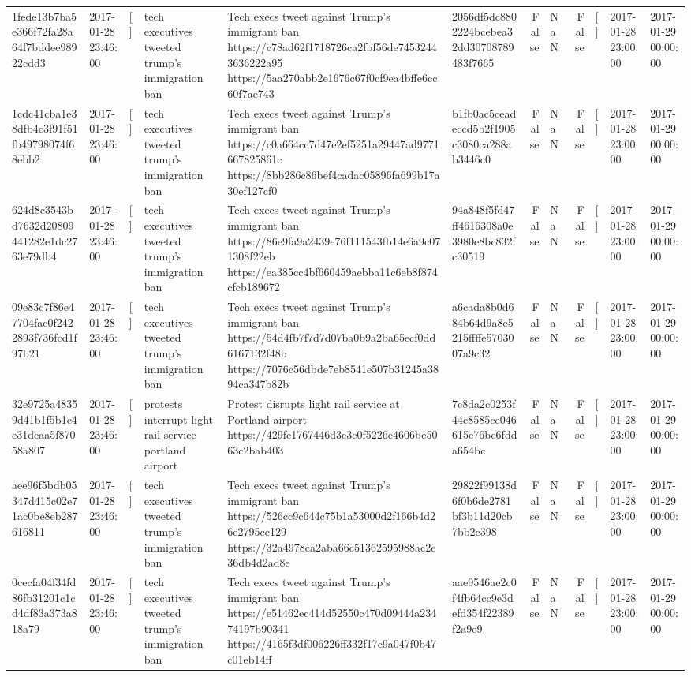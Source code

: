 \begin{tabular}{llllllrlrlll}
1fede13b7ba5e366f72fa28a64f7bddee98922cdd3 & 2017-01-28 23:46:00 & [] & tech executives tweeted trump's immigration ban & Tech execs tweet against Trump's immigrant ban https://c78ad62f1718726ca2fbf56de74532443636222a95 https://5aa270abb2e1676c67f0cf9ea4bffe6cc60f7ae743 & 2056df5dc8802224bcebea32dd30708789483f7665 & False & NaN & False & [] & 2017-01-28 23:00:00 & 2017-01-29 00:00:00 \\
1cdc41cba1e38dfb4c3f91f51fb49798074f68ebb2 & 2017-01-28 23:46:00 & [] & tech executives tweeted trump's immigration ban & Tech execs tweet against Trump's immigrant ban https://c0a664cc7d47e2ef5251a29447ad9771667825861c https://8bb286c86bef4cadac05896fa699b17a30ef127cf0 & b1fb0ac5ceadeccd5b2f1905c3080ca288ab3446c0 & False & NaN & False & [] & 2017-01-28 23:00:00 & 2017-01-29 00:00:00 \\
624d8c3543bd7632d20809441282e1dc2763e79db4 & 2017-01-28 23:46:00 & [] & tech executives tweeted trump's immigration ban & Tech execs tweet against Trump's immigrant ban https://86e9fa9a2439e76f111543fb14e6a9c071308f22eb https://ea385cc4bf660459aebba11c6eb8f874cfcb189672 & 94a848f5fd47ff4616308a0e3980e8bc832fc30519 & False & NaN & False & [] & 2017-01-28 23:00:00 & 2017-01-29 00:00:00 \\
09e83c7f86e47704fac0f2422893f736fcd1f97b21 & 2017-01-28 23:46:00 & [] & tech executives tweeted trump's immigration ban & Tech execs tweet against Trump's immigrant ban https://54d4fb7f7d7d07ba0b9a2ba65ecf0dd6167132f48b https://7076c56dbde7eb8541e507b31245a3894ca347b82b & a6cada8b0d684b64d9a8e5215ffffe5703007a9c32 & False & NaN & False & [] & 2017-01-28 23:00:00 & 2017-01-29 00:00:00 \\
32e9725a48359d41b1f5b1c4e31dcaa5f87058a807 & 2017-01-28 23:46:00 & [] & protests interrupt light rail service portland airport & Protest disrupts light rail service at Portland airport https://429fc1767446d3c3c0f5226e4606be5063c2bab403 & 7c8da2c0253f44c8585ce046615c76be6fdda654bc & False & NaN & False & [] & 2017-01-28 23:00:00 & 2017-01-29 00:00:00 \\
aee96f5bdb05347d415c02e71ac0be8eb287616811 & 2017-01-28 23:46:00 & [] & tech executives tweeted trump's immigration ban & Tech execs tweet against Trump's immigrant ban https://526cc9c644c75b1a53000d2f166b4d26e2795ce129 https://32a4978ca2aba66c51362595988ac2e36db4d2ad8e & 29822f99138d6f0b6de2781bf3b11d20cb7bb2c398 & False & NaN & False & [] & 2017-01-28 23:00:00 & 2017-01-29 00:00:00 \\
0cecfa04f34fd86fb31201c1cd4df83a373a818a79 & 2017-01-28 23:46:00 & [] & tech executives tweeted trump's immigration ban & Tech execs tweet against Trump's immigrant ban https://e51462ec414d52550c470d09444a23474197b90341 https://4165f3df006226ff332f17c9a047f0b47c01eb14ff & aae9546ae2c0f4fb64cc9e3defd354f22389f2a9e9 & False & NaN & False & [] & 2017-01-28 23:00:00 & 2017-01-29 00:00:00 \\

\end{tabular}
